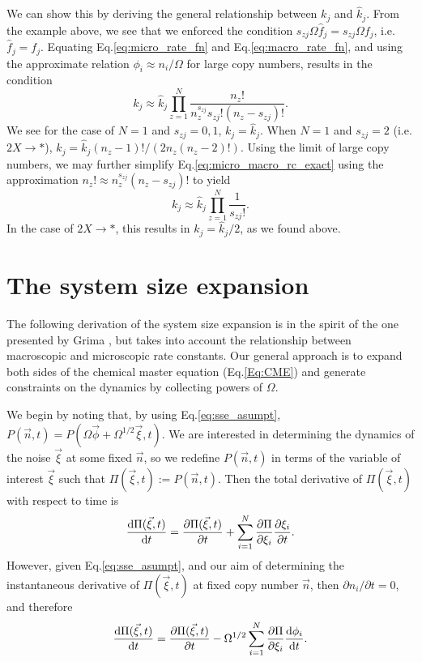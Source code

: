 \documentclass[10pt,letterpaper]{article}
\begin{document}
We can show this by deriving the general relationship between $k_j$ and $\hat{k}_j$. From the example above, we see that we enforced the condition $s_{zj}\Omega \hat{f}_j= s_{zj} \Omega f_j$, i.e.\ $\hat{f}_j = f_j$. Equating Eq.\eqref{eq:micro_rate_fn} and Eq.\eqref{eq:macro_rate_fn}, and using the approximate relation $\phi_i\approx n_i/\Omega$ for large copy numbers, results in the condition
\begin{equation}
k_j \approx \hat{k}_j\prod_{z=1}^N \frac{n_z!}{n_z^{s_{zj}}s_{zj}!(n_z-s_{zj})!}. \label{eq:micro_macro_rc_exact}
\end{equation}
We see for the case of $N=1$ and $s_{zj}=0,1$, $k_j=\hat{k}_j$. When $N=1$ and $s_{zj}=2$ (i.e. $2X\rightarrow *$), $k_j=\hat{k}_j (n_z-1)!/(2n_z(n_z-2)!)$. Using the limit of large copy numbers, we may further simplify Eq.\eqref{eq:micro_macro_rc_exact} using the approximation $n_z! \approx n_z^{s_{zj}}(n_z - s_{zj})!$ to yield \cite{Aryaman19b}
\begin{equation}
\boxed{k_j \approx \hat{k}_j \prod_{z=1}^N \frac{1}{s_{zj}!}}. \label{eq:micro_macro_rc}
\end{equation}
In the case of $2X \rightarrow *$, this results in  $k_j = \hat{k}_j/2$, as we found above.

\section{The system size expansion}\label{sec:sse_proof}
The following derivation of the system size expansion is in the spirit of the one presented by Grima \cite{Grima10}, but takes into account the relationship between macroscopic and microscopic rate constants. Our general approach is to expand both sides of the chemical master equation (Eq.\eqref{Eq:CME}) and generate constraints on the dynamics by collecting powers of $\Omega$.

We begin by noting that, by using Eq.\eqref{eq:sse_asumpt}, $P(\vec{n},t) = P(\Omega \vec{\phi} + \Omega^{1/2} \vec{\xi},t)$. We are interested in determining the dynamics of the noise $\vec{\xi}$ at some fixed $\vec{n}$, so we redefine $P(\vec{n},t)$ in terms of the variable of interest $\vec{\xi}$ such that $\Pi(\vec{\xi},t):= P(\vec{n},t)$. Then the total derivative of $\Pi(\vec{\xi},t)$ with respect to time is
\begin{equation}
\frac{\text{d}\Pi(\vec{\xi},t)}{\text{d}t}= \frac{\partial\Pi(\vec{\xi},t)}{\partial t} + \sum_{i=1}^N \frac{\partial\Pi}{\partial\xi_i} \frac{\partial\xi_i}{\partial t}.
\end{equation}
However, given Eq.\eqref{eq:sse_asumpt}, and our aim of determining the instantaneous derivative of $\Pi(\vec{\xi},t)$ at fixed copy number $\vec{n}$, then $\partial n_i / \partial t = 0$, and therefore
\begin{equation}
\frac{\text{d}\Pi(\vec{\xi},t)}{\text{d}t}= \frac{\partial\Pi(\vec{\xi},t)}{\partial t} - \Omega^{1/2} \sum_{i=1}^N \frac{\partial\Pi}{\partial\xi_i} \frac{\text{d}\phi_i}{\text{d}t}. \label{eq:exp_pi}
\end{equation}
\end{document}
